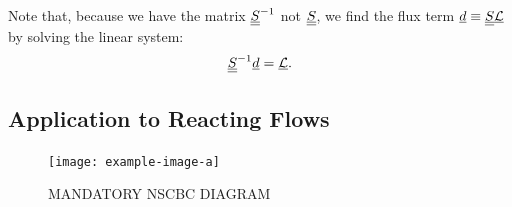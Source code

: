 Note that, because we have the matrix $\underline{\underline{S}}^{-1}$ not $\underline{\underline{S}}$, we find the flux term $\underline{d} \equiv \underline{\underline{S}}\underline{\mathcal{L}}$ by solving the linear system:
\begin{equation}
\underline{\underline{S}}^{-1} \underline{d} = \underline{\mathcal{L}}.
\end{equation}




\subsection{Application to Reacting Flows}

\begin{figure}[t]
\centering
\texttt{[image: example-image-a]}
\caption{MANDATORY NSCBC DIAGRAM}
\label{fig:NSCBC}
\end{figure}

